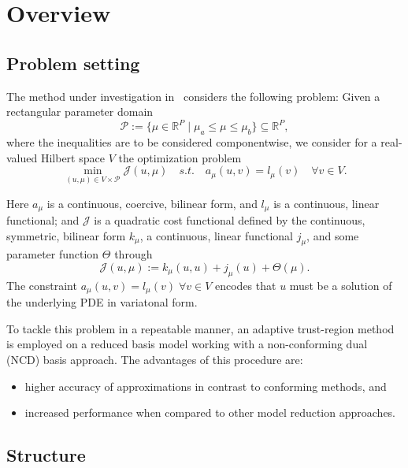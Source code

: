 \section{Overview}

\subsection{Problem setting}

The method under investigation in~\cite{Keil2021} considers the following problem: Given a rectangular parameter domain
\begin{equation*}\label{ParRect}
    \mathcal{P} := \{ \mu \in \mathbb{R}^P \; | \; \mu_a \leq \mu \leq \mu_b \} \subseteq \mathbb{R}^P,
\end{equation*}
where the inequalities are to be considered componentwise, we consider for a real-valued Hilbert space $V$ the optimization problem
\begin{equation}\label{SettingOpti}
    \min\limits_{(u, \mu) \in V \times \mathcal{P}} \mathcal{J}(u, \mu) \quad s.t. \quad a_\mu(u, v) = l_\mu(v) \quad \forall v \in V.
\end{equation}

Here $a_\mu$ is a continuous, coercive, bilinear form, and $l_\mu$ is a continuous, linear functional; and $\mathcal{J}$ is a quadratic cost functional defined by the continuous, symmetric, bilinear form $k_\mu$, a continuous, linear functional $j_\mu$, and some parameter function $\Theta$ through
\begin{equation*}
    \mathcal{J}(u, \mu) := k_\mu(u, u) + j_\mu(u) + \Theta(\mu).
\end{equation*}
The constraint $a_\mu(u, v) = l_\mu(v) \; \forall v \in V$ encodes that $u$ must be a solution of the underlying PDE in variatonal form.

To tackle this problem in a repeatable manner, an adaptive trust-region method is employed on a reduced basis model working with a non-conforming dual (NCD) basis approach.
The advantages of this procedure are:
\begin{itemize}
    \item higher accuracy of approximations in contrast to conforming methods, and
    \item increased performance when compared to other model reduction approaches.
\end{itemize}

\subsection{Structure}

